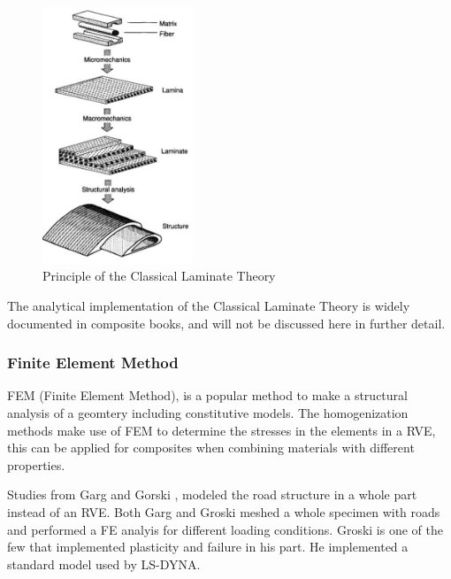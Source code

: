 \begin{figure}[htb]
    \centering
    \includegraphics[width=0.4\textwidth]{chapter_2/figures/CompositeTheory.PNG}
    \caption{Principle of the Classical Laminate Theory \cite{Daniel2006EngineeringMaterials}}
    \label{fig:Transverseraster}
\end{figure}
The analytical implementation of the Classical Laminate Theory is widely documented in composite books, and will not be discussed here in further detail. 

\subsubsection{Finite Element Method}    
\label{FiniteElementMethod}
FEM (Finite Element Method), is a popular method to make a structural analysis of a geomtery including constitutive models. The homogenization methods make use of FEM to determine the stresses in the elements in a RVE, this can be applied for composites when combining materials with different properties.

Studies from Garg \cite{Garg2017AnStudy} and Gorski \cite{Gorski2015ComputationMethod}, modeled the road structure in a whole part instead of an RVE. Both Garg \cite{Garg2017AnStudy} and Groski meshed a whole  specimen with roads and performed a FE analyis for different loading conditions. Groski is one of the few that implemented plasticity and failure in his part. He implemented a standard model used by LS-DYNA.  


